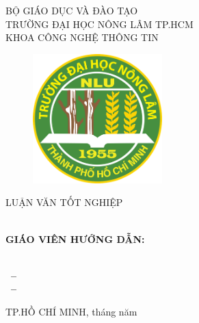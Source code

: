 \begin{titlepage}

  \begin{center}
    BỘ GIÁO DỤC VÀ ĐÀO TẠO\\
    TRƯỜNG ĐẠI HỌC NÔNG LÂM TP.HCM\\
    KHOA CÔNG NGHỆ THÔNG TIN\\[0.5cm]
    
    \begin{figure}[htp]
    \centering
    \includegraphics[width=5cm]{images/Logo_HCMUAF.png}
\end{figure}

    \Large LUẬN VĂN TỐT NGHIỆP\\[2cm]

    { \Large \bfseries \MakeUppercase{\tenKL} \\[2cm] } %
    \begin{multicols}{2}
    \begin{small}
    \begin{flushleft}
    
    
     {\bfseries GIÁO VIÊN HƯỚNG DẪN:\\
    \MakeUppercase{\tenGVHD} \\[1cm]}

    { \bfseries \MakeUppercase{\tenSVa~--~\mssva~\\\tenSVb~--~\mssvb} \\[1cm] }
   \end{flushleft}
    \end{small}
    \end{multicols}

    
    \vfill
    TP.HỒ CHÍ MINH, tháng \hspace*{1cm} năm     
  \end{center}
  
\end{titlepage}